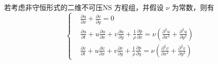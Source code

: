 \documentclass[12pt]{article}
\begin{document}
若考虑非守恒形式的二维不可压NS 方程组，并假设 $\nu$ 为常数，则有
\begin{equation}
	\left\{\begin{aligned}
		 & \frac{\partial u}{\partial x}+\frac{\partial v}{\partial y}=0                                                                                                                                                                          \\
		 & \frac{\partial u}{\partial t}+u \frac{\partial u}{\partial x}+v \frac{\partial u}{\partial y}+\frac{1}{\rho} \frac{\partial p}{\partial x}=\nu\left(\frac{\partial^{2} u}{\partial x^{2}}+\frac{\partial^{2} u}{\partial y^{2}}\right) \\
		 & \frac{\partial v}{\partial t}+u \frac{\partial v}{\partial x}+v \frac{\partial v}{\partial y}+\frac{1}{\rho} \frac{\partial p}{\partial y}=\nu\left(\frac{\partial^{2} v}{\partial x^{2}}+\frac{\partial^{2} v}{\partial y^{2}}\right)
	\end{aligned}\right.
\end{equation}
\end{document}
